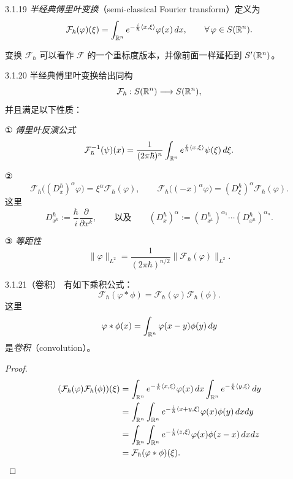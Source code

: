 \begin{definition}{3.1.19}
\emph{半经典傅里叶变换}（semi-classical Fourier transform）定义为
\[
\mathcal{F}_\hbar(\varphi)(\xi)=\int_{\mathbb{R}^n}e^{-\frac i\hbar\langle x,\xi\rangle}\varphi(x)\,dx,
\qquad\forall\,\varphi\in S(\mathbb{R}^n).
\]
\end{definition}

变换 $\mathcal{F}_\hbar$ 可以看作 $\mathcal{F}$ 的一个重标度版本，并像前面一样延拓到 $S'(\mathbb{R}^n)$。

\begin{theorem}{3.1.20}
半经典傅里叶变换给出同构
\[
\mathcal{F}_\hbar:S(\mathbb{R}^n)\longrightarrow S(\mathbb{R}^n),
\]
并且满足以下性质：

① \emph{傅里叶反演公式}
\[
\mathcal{F}_\hbar^{-1}(\psi)(x)=\frac{1}{(2\pi\hbar)^n}\int_{\mathbb{R}^n}e^{\frac i\hbar\langle x,\xi\rangle}\psi(\xi)\,d\xi.
\]

②
\[
\mathcal{F}_\hbar\bigl((D_{x}^\hbar)^\alpha\varphi\bigr)=\xi^\alpha\mathcal{F}_\hbar(\varphi),\qquad
\mathcal{F}_\hbar\bigl((-x)^\alpha\varphi\bigr)=(D_{\xi}^\hbar)^\alpha\mathcal{F}_\hbar(\varphi).
\]
这里
\[
D_{x^k}^\hbar:=\frac{\hbar}{i}\frac{\partial}{\partial x^k},
\qquad\text{以及}\qquad
(D_{x}^\hbar)^\alpha:=(D_{x^1}^\hbar)^{\alpha_1}\cdots(D_{x^n}^\hbar)^{\alpha_n}.
\]

③ \emph{等距性}
\[
\|\varphi\|_{L^2}=\frac{1}{(2\pi\hbar)^{n/2}}\|\mathcal{F}_\hbar(\varphi)\|_{L^2}.
\]
\end{theorem}

\begin{proposition}{3.1.21}（卷积）
有如下乘积公式：
\[
\mathcal{F}_\hbar(\varphi*\phi)=\mathcal{F}_\hbar(\varphi)\mathcal{F}_\hbar(\phi).
\]
这里
\[
\varphi*\phi(x)=\int_{\mathbb{R}^n}\varphi(x-y)\phi(y)\,dy
\]
是\emph{卷积}（convolution）。
\end{proposition}

\begin{proof}
\begin{align*}
(\mathcal{F}_\hbar(\varphi)\mathcal{F}_\hbar(\phi))(\xi)
&=\int_{\mathbb{R}^n}e^{-\frac i\hbar\langle x,\xi\rangle}\varphi(x)\,dx
\int_{\mathbb{R}^n}e^{-\frac i\hbar\langle y,\xi\rangle}\,dy\\
&=\int_{\mathbb{R}^n}\int_{\mathbb{R}^n}e^{-\frac i\hbar\langle x+y,\xi\rangle}\varphi(x)\phi(y)\,dxdy\\
&=\int_{\mathbb{R}^n}\int_{\mathbb{R}^n}e^{-\frac i\hbar\langle z,\xi\rangle}\varphi(x)\phi(z-x)\,dxdz\\
&=\mathcal{F}_\hbar(\varphi*\phi)(\xi).
\end{align*}
\end{proof}

